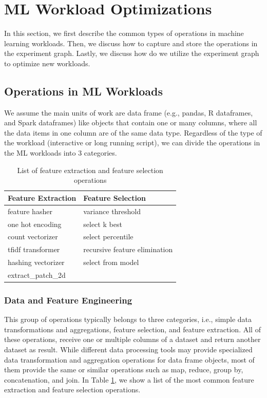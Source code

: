 \section{ML Workload Optimizations} \label{sec-ml-workloads}
In this section, we first describe the common types of operations in machine learning workloads.
Then, we discuss how to capture and store the operations in the experiment graph.
Lastly, we discuss how do we utilize the experiment graph to optimize new workloads.

\subsection{Operations in ML Workloads}
We assume the main units of work are data frame (e.g., pandas, R dataframes, and Spark dataframes) like objects that contain one or many columns, where all the data items in one column are of the same data type.
Regardless of the type of the workload (interactive or long running script), we can divide the operations in the ML workloads into 3 categories.
\begin{table}
\centering
\begin{tabular}{ll}
\hline
	   Feature Extraction & Feature Selection\\ \hline
        feature hasher & variance threshold  \\
        one hot encoding & select k best \\
        count vectorizer& select percentile \\ 
        tfidf transformer & recursive feature elimination \\
        hashing vectorizer & select from model \\
        extract\_patch\_2d &  \\
        \hline
\end{tabular}
\caption{List of feature extraction and feature selection operations}\label{feature-engineering-operations}
\end{table}

\subsubsection{Data and Feature Engineering}
This group of operations typically belongs to three categories, i.e., simple data transformations and aggregations, feature selection, and feature extraction.
All of these operations, receive one or multiple columns of a dataset and return another dataset as result. 
While different data processing tools may provide specialized data transformation and aggregation operations for data frame objects, most of them provide the same or similar operations such as map, reduce, group by, concatenation, and join. 
In Table \ref{feature-engineering-operations}, we show a list of the most common feature extraction and feature selection operations.

